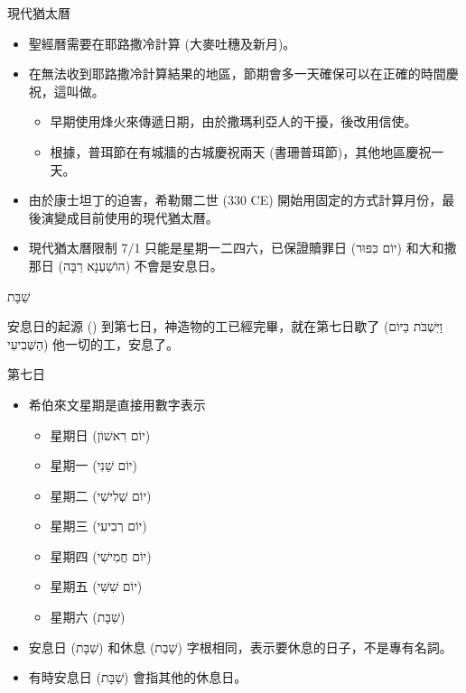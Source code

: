 \documentclass{beamer}
\newcommand{\topic}[1]{
  \begin{frame}
    \centering
    \vspace*{1cm}
    {\fontsize{40}{48}\selectfont #1\par}
    \vfill
  \end{frame}
}
\newcommand{\parvspace}{\par\vspace{0.5em}}
\begin{document}
\begin{frame}{現代猶太曆}
  \begin{itemize}
    \item 聖經曆需要在耶路撒冷計算 (大麥吐穗及新月)。
    \item 在無法收到耶路撒冷計算結果的地區，節期會多一天確保可以在正確的時間慶祝，這叫做\textcite{YomTovSheni}。
      \begin{itemize}
        \item 早期使用烽火來傳遞日期，由於撒瑪利亞人的干擾，後改用信使。\parencite{HistoryOfCalendar}
        \item 根據，普珥節在有城牆的古城慶祝兩天 (書珊普珥節)，其他地區慶祝一天。
      \end{itemize}
    \item 由於康士坦丁的迫害，希勒爾二世 (330 CE) 開始用固定的方式計算月份，最後演變成目前使用的現代猶太曆。\parencite{HistoryOfCalendar}
    \item 現代猶太曆限制 7/1 只能是星期一二四六，已保證贖罪日 (\texthebrew{יוֹם כִּפּוּר}) 和大和撒那日 (\texthebrew{הוֹשַׁעְנָא רַבָּה}) 不會是安息日。\parencite{JewishCalendar}
  \end{itemize}
\end{frame}

\topic{\texthebrew{שַׁבָּת}}

\begin{frame}{安息日的起源}
  () 到第七日，神造物的工已經完畢，就在\alert{第七日歇了 (\texthebrew{וַיִּשְׁבֹּת בַּיּוֹם הַשְּׁבִיעִי})} 他一切的工，安息了。\parvspace
\end{frame}

\begin{frame}{第七日}
  \begin{itemize}
    \item 希伯來文星期是直接用數字表示
      \begin{itemize}
        \item 星期日 (\texthebrew{יוֹם רִאשׁוֹן})
        \item 星期一 (\texthebrew{יוֹם שֵׁנִי})
        \item 星期二 (\texthebrew{יוֹם שְׁלִישִׁי})
        \item 星期三 (\texthebrew{יוֹם רְבִיעִי})
        \item 星期四 (\texthebrew{יוֹם חֲמִישִׁי})
        \item 星期五 (\texthebrew{יוֹם שִׁשִּׁי})
        \item 星期六 (\texthebrew{שַׁבָּת})
      \end{itemize}
    \item 安息日 (\texthebrew{שַׁבָּת}) 和休息 (\texthebrew{שָׁבַת})
      字根相同，表示要休息的日子，不是專有名詞。
    \item 有時安息日 (\texthebrew{שַׁבָּת}) 會指其他的休息日。
  \end{itemize}
\end{frame}
\end{document}
